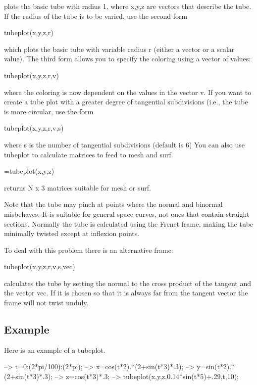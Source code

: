  plots the basic tube with radius 1, where {\ttfamily x,y,z} are vectors that describe the tube. If the radius of the tube is to be varied, use the second form \begin{DoxyVerb}    tubeplot(x,y,z,r) 
\end{DoxyVerb}
 which plots the basic tube with variable radius r (either a vector or a scalar value). The third form allows you to specify the coloring using a vector of values\-: \begin{DoxyVerb}    tubeplot(x,y,z,r,v)
\end{DoxyVerb}
 where the coloring is now dependent on the values in the vector {\ttfamily v}. If you want to create a tube plot with a greater degree of tangential subdivisions (i.\-e., the tube is more circular, use the form \begin{DoxyVerb}    tubeplot(x,y,z,r,v,s)
\end{DoxyVerb}
 where {\ttfamily s} is the number of tangential subdivisions (default is 6) You can also use {\ttfamily tubeplot} to calculate matrices to feed to {\ttfamily mesh} and {\ttfamily surf}. \begin{DoxyVerb}    [X,Y,Z]=tubeplot(x,y,z)
\end{DoxyVerb}
 returns {\ttfamily N x 3} matrices suitable for mesh or surf.

Note that the tube may pinch at points where the normal and binormal misbehaves. It is suitable for general space curves, not ones that contain straight sections. Normally the tube is calculated using the Frenet frame, making the tube minimally twisted except at inflexion points.

To deal with this problem there is an alternative frame\-: \begin{DoxyVerb}    tubeplot(x,y,z,r,v,s,vec)
\end{DoxyVerb}
 calculates the tube by setting the normal to the cross product of the tangent and the vector vec. If it is chosen so that it is always far from the tangent vector the frame will not twist unduly. \hypertarget{variables_struct_Example}{}\subsection{Example}\label{variables_struct_Example}
Here is an example of a {\ttfamily tubeplot}.


\begin{DoxyVerbInclude}
--> t=0:(2*pi/100):(2*pi);
--> x=cos(t*2).*(2+sin(t*3)*.3);
--> y=sin(t*2).*(2+sin(t*3)*.3);
--> z=cos(t*3)*.3;
--> tubeplot(x,y,z,0.14*sin(t*5)+.29,t,10);
\end{DoxyVerbInclude}


